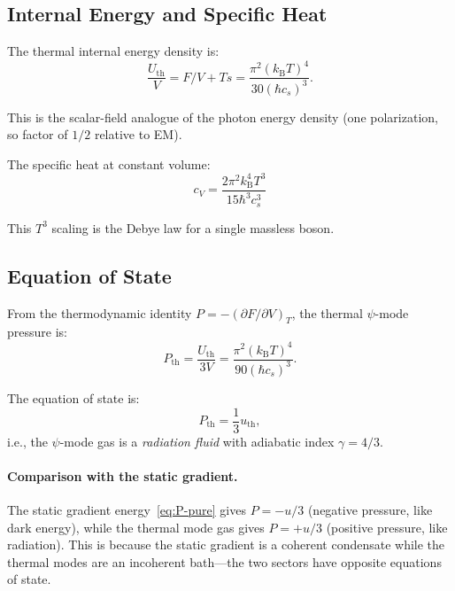 \documentclass[aps,prd,twocolumn,showpacs,preprintnumbers,superscriptaddress,nofootinbib]{revtex4-2}
\newcommand{\kB}{k_{\mathrm{B}}}
\begin{document}
\subsection{Internal Energy and Specific Heat}\label{sec:internal-energy}

The thermal internal energy density is:
\begin{equation}\label{eq:u-thermal}
\frac{U_{\mathrm{th}}}{V} = F/V + Ts
  = \frac{\pi^2(\kB T)^4}{30(\hbar c_s)^3}.
\end{equation}

This is the scalar-field analogue of the photon energy density (one
polarization, so factor of $1/2$ relative to EM).

The specific heat at constant volume:
\begin{equation}\label{eq:cv}
\boxed{c_V = \frac{2\pi^2 \kB^4 T^3}{15 \hbar^3 c_s^3}}
\end{equation}

This $T^3$ scaling is the Debye law for a single massless boson.

\subsection{Equation of State}\label{sec:eos}

From the thermodynamic identity $P = -(\partial F/\partial V)_T$, the
thermal $\psi$-mode pressure is:
\begin{equation}\label{eq:eos-thermal}
\boxed{P_{\mathrm{th}} = \frac{U_{\mathrm{th}}}{3V}
  = \frac{\pi^2(\kB T)^4}{90(\hbar c_s)^3}.}
\end{equation}

The equation of state is:
\begin{equation}
P_{\mathrm{th}} = \frac{1}{3}u_{\mathrm{th}},
\end{equation}
i.e., the $\psi$-mode gas is a \emph{radiation fluid} with adiabatic
index $\gamma = 4/3$.

\paragraph{Comparison with the static gradient.}
The static gradient energy~\eqref{eq:P-pure} gives $P = -u/3$
(negative pressure, like dark energy), while the thermal mode gas
gives $P = +u/3$ (positive pressure, like radiation).  This is
because the static gradient is a coherent condensate while the thermal
modes are an incoherent bath---the two sectors have opposite equations
of state.
\end{document}
